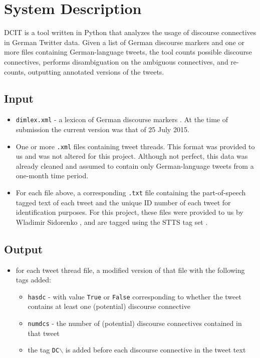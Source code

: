 \documentclass[11pt]{article}
\def\mono#1{\texttt{#1}}  %
\begin{document}
\section{System Description}
DCIT is a tool written in Python that analyzes the usage of discourse connectives in German Twitter data.  Given a list of German discourse markers and one or more files containing German-language tweets, the tool counts possible discourse connectives, performs disambiguation on the ambiguous connectives, and re-counts, outputting annotated versions of the tweets.

\subsection{Input}
\begin{itemize} 

\item \mono{dimlex.xml} - a lexicon of German discourse markers \cite{dimlex}.  At the time of submission the current version was that of 25 July 2015.

\item One or more \mono{.xml} files containing tweet threads.  This format was provided to us and was not altered for this project.  Although not perfect, this data was already cleaned and assumed to contain only German-language tweets from a one-month time period.

\item For each file above, a corresponding \mono{.txt} file containing the part-of-speech tagged text of each tweet and the unique ID number of each tweet for identification purposes.  For this project, these files were provided to us by Wladimir Sidorenko \cite{WladimirSidorenko}, and are tagged using the STTS tag set \cite{stts}.
\end{itemize}

\subsection{Output}
\begin{itemize} 

\item for each tweet thread file, a modified version of that file with the following tags added:
\begin{itemize} 

\item  \mono{has\textunderscore dc} - with value \mono{True} or \mono{False} corresponding to whether the tweet contains at least one (potential) discourse connective
\item  \mono{num\textunderscore dcs} - the number of (potential) discourse connectives contained in that tweet
\item  the tag \mono{DC$\backslash$} is added before each discourse connective in the tweet text

\end{itemize} %

\end{itemize} %
\end{document}
